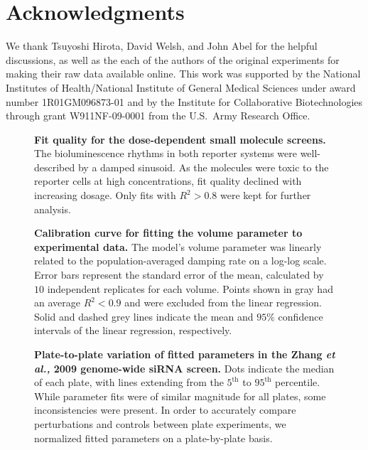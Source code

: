 \documentclass[11pt, letterpaper]{article}
\newcommand{\beginsupplement}{%
        \clearpage
        \setcounter{table}{0}
        \renewcommand{\thetable}{S\arabic{table}}%
        \setcounter{figure}{0}
        \renewcommand{\thefigure}{S\arabic{figure}}%
     }
\begin{document}
\section*{Acknowledgments}
We thank Tsuyoshi Hirota, David Welsh, and John Abel for the helpful discussions, as well as the each of the authors of the original experiments for making their raw data available online.
This work was supported by the National Institutes of Health/National Institute of General Medical Sciences under award number 1R01GM096873-01 and by the Institute for Collaborative Biotechnologies through grant W911NF-09-0001 from the U.S.\ Army Research Office.





\beginsupplement

\begin{figure}[tbp]
  \begin{center}
  \end{center}
  \caption{{\bfseries Fit quality for the dose-dependent small molecule screens.} The bioluminescence rhythms in both reporter systems were well-described by a damped sinusoid. As the molecules were toxic to the reporter cells at high concentrations, fit quality declined with increasing dosage. Only fits with $R^2 > 0.8$ were kept for further analysis.}
\label{fig:small_molecule_r2}
\end{figure}

\begin{figure}[tbp]
  \begin{center}
  \end{center}
  \caption{{\bfseries Calibration curve for fitting the volume parameter to experimental data.} The model's volume parameter was linearly related to the population-averaged damping rate on a log-log scale. Error bars represent the standard error of the mean, calculated by $10$ independent replicates for each volume. Points shown in gray had an average $R^2 < 0.9$ and were excluded from the linear regression. Solid and dashed grey lines indicate the mean and $95\%$ confidence intervals of the linear regression, respectively.}
\label{fig:vol_calibration}
\end{figure}

\begin{figure}[tbp]
  \begin{center}
  \end{center}
  \caption{{\bfseries Plate-to-plate variation of fitted parameters in the Zhang {\itshape et al.,} 2009 genome-wide siRNA screen.} Dots indicate the median of each plate, with lines extending from the $5^\text{th}$ to $95^\text{th}$ percentile. While parameter fits were of similar magnitude for all plates, some inconsistencies were present. In order to accurately compare perturbations and controls between plate experiments, we normalized fitted parameters on a plate-by-plate basis.}
\label{fig:plate_variation}
\end{figure}
\end{document}
